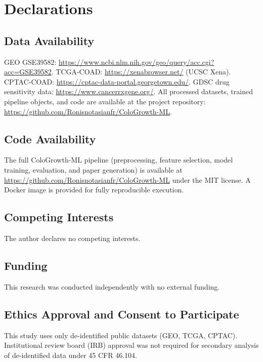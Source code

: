 \documentclass[12pt]{article}
\begin{document}
\section{Declarations}

\subsection{Data Availability}

GEO GSE39582: \url{https://www.ncbi.nlm.nih.gov/geo/query/acc.cgi?acc=GSE39582}. TCGA-COAD: \url{https://xenabrowser.net/} (UCSC Xena). CPTAC-COAD: \url{https://cptac-data-portal.georgetown.edu/}. GDSC drug sensitivity data: \url{https://www.cancerrxgene.org/}. All processed datasets, trained pipeline objects, and code are available at the project repository: \url{https://github.com/Ronisnotasianfr/ColoGrowth-ML}.

\subsection{Code Availability}

The full ColoGrowth-ML pipeline (preprocessing, feature selection, model training, evaluation, and paper generation) is available at \url{https://github.com/Ronisnotasianfr/ColoGrowth-ML} under the MIT license. A Docker image is provided for fully reproducible execution.

\subsection{Competing Interests}

The author declares no competing interests.

\subsection{Funding}

This research was conducted independently with no external funding.

\subsection{Ethics Approval and Consent to Participate}

This study uses only de-identified public datasets (GEO, TCGA, CPTAC). Institutional review board (IRB) approval was not required for secondary analysis of de-identified data under 45 CFR 46.104.
\end{document}
